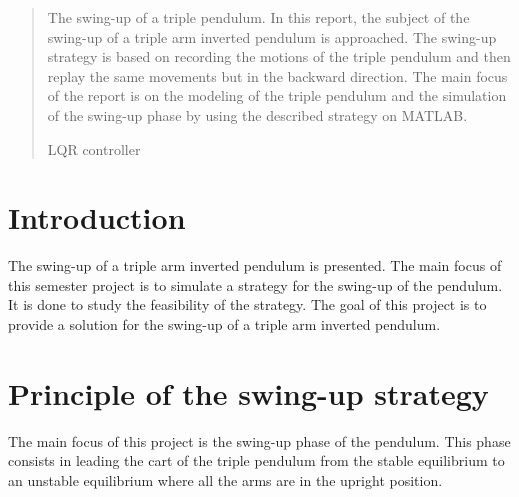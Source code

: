 \documentclass[a4paper,12pt,twoside]{article}
\begin{document}
\renewcommand{\headheight}{14.5pt}
\renewcommand{\tablename}{Table}
\renewcommand{\figurename}{Figure}

\hypersetup{pageanchor=false}

\hypersetup{pageanchor=true}

\newpage
\thispagestyle{empty}
\tableofcontents
\newpage


\begin{abstract}
The swing-up of a triple pendulum.
In this report, the subject of the swing-up of a triple arm inverted pendulum is approached. The swing-up strategy is based on recording the motions of the triple pendulum and then replay the same movements but in the backward direction. The main focus of the report is on the modeling of the triple pendulum and the simulation of the swing-up phase by using the described strategy on MATLAB.

LQR controller
\end{abstract}
\newpage

\section{Introduction}\label{sec:intro} %
The swing-up of a triple arm inverted pendulum is presented. The main focus of this semester project is to simulate a strategy for the swing-up of the pendulum. It is done to study the feasibility of the strategy.
The goal of this project is to provide a solution for the swing-up of a triple arm inverted pendulum.

\section{Principle of the swing-up strategy}
The main focus of this project is the swing-up phase of the pendulum. This phase consists in leading the cart of the triple pendulum from the stable equilibrium to an unstable equilibrium where all the arms are in the upright position. 
\end{document}
